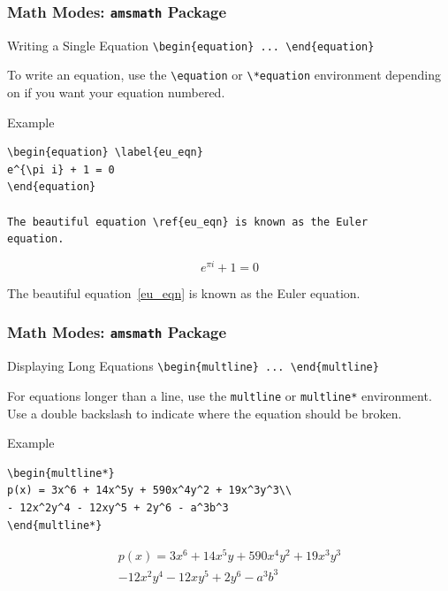 \begin{frame}[fragile]
\frametitle{Math Modes: \texttt{amsmath} Package} 
\begin{block}{Writing a Single Equation}
    \verb|\begin{equation} ... \end{equation}| \\
\end{block}
To write an equation, use the \verb|\equation| or \verb|\*equation| environment depending on if you want your equation numbered. %
\begin{exampleblock}{Example}
\small
\begin{verbatim}
\begin{equation} \label{eu_eqn}
e^{\pi i} + 1 = 0
\end{equation}

The beautiful equation \ref{eu_eqn} is known as the Euler
equation.
\end{verbatim}
\begin{equation} \label{eu_eqn}
e^{\pi i} + 1 = 0
\end{equation}

The beautiful equation~\ref{eu_eqn} is known as the Euler
equation.
\end{exampleblock}
\end{frame}



\begin{frame}[fragile]
\frametitle{Math Modes: \texttt{amsmath} Package} 
\begin{block}{Displaying Long Equations}
    \verb|\begin{multline} ... \end{multline}| \\
\end{block}
For equations longer than a line, use the \verb|multline| or \verb|multline*| environment. Use a double backslash to indicate where the equation should be broken.
\begin{exampleblock}{Example}
\small
\begin{verbatim}
\begin{multline*}
p(x) = 3x^6 + 14x^5y + 590x^4y^2 + 19x^3y^3\\ 
- 12x^2y^4 - 12xy^5 + 2y^6 - a^3b^3
\end{multline*}
\end{verbatim}
\begin{multline*}
p(x) = 3x^6 + 14x^5y + 590x^4y^2 + 19x^3y^3\\ 
- 12x^2y^4 - 12xy^5 + 2y^6 - a^3b^3
\end{multline*}
\end{exampleblock}
\end{frame}


